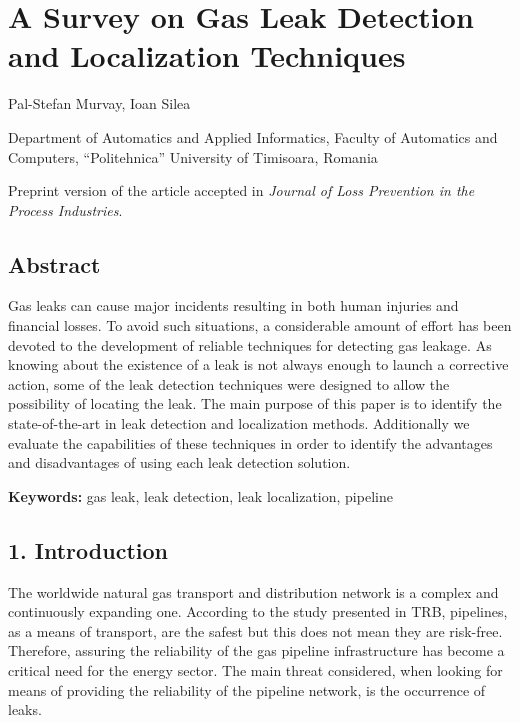 
\chapter*{A Survey on Gas Leak Detection and Localization Techniques}

\noindent Pal-Stefan Murvay, Ioan Silea

\noindent Department of Automatics and Applied Informatics, Faculty of Automatics and Computers, ``Politehnica'' University of Timisoara, Romania

\noindent Preprint version of the article accepted in \textit{Journal of Loss Prevention in the Process Industries}.

\section*{Abstract}

Gas leaks can cause major incidents resulting in both human injuries and financial losses. To avoid such situations, a considerable amount of effort has been devoted to the development of reliable techniques for detecting gas leakage. As knowing about the existence of a leak is not always enough to launch a corrective action, some of the leak detection techniques were designed to allow the possibility of locating the leak. The main purpose of this paper is to identify the state-of-the-art in leak detection and localization methods. Additionally we evaluate the capabilities of these techniques in order to identify the advantages and disadvantages of using each leak detection solution.

\noindent\textbf{Keywords:} gas leak, leak detection, leak localization, pipeline

\section*{1. Introduction}

The worldwide natural gas transport and distribution network is a complex and continuously expanding one. According to the study presented in TRB, pipelines, as a means of transport, are the safest but this does not mean they are risk-free. Therefore, assuring the reliability of the gas pipeline infrastructure has become a critical need for the energy sector. The main threat considered, when looking for means of providing the reliability of the pipeline network, is the occurrence of leaks.


